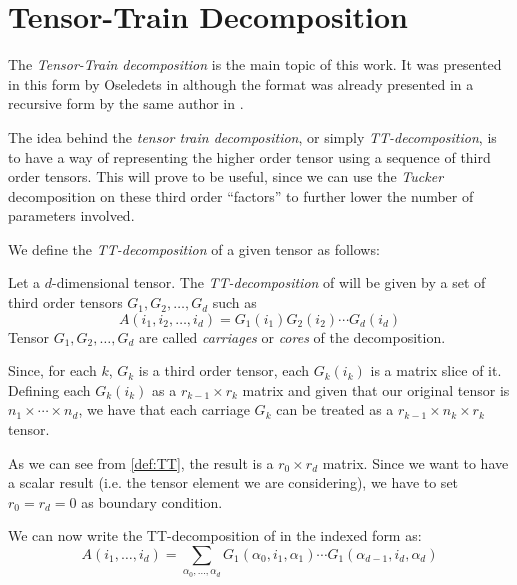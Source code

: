 \chapter{Tensor-Train Decomposition}

The \emph{Tensor-Train decomposition} is the main topic of this work. It was presented in this form by Oseledets in \cite{oseledets2011tt} although the format was already presented in a recursive form by the same author in \cite{oseledetstyrty2009}.

The idea behind the \emph{tensor train decomposition}, or simply \emph{TT-decomposition}, is to have a way of representing the higher order tensor using a sequence of third order tensors. This will prove to be useful, since we can use the \emph{Tucker} decomposition on these third order ``factors'' to further lower the number of parameters involved.

We define the \emph{TT-decomposition} of a given tensor \A as follows:

\begin{Def}
  Let \A a $d$-dimensional tensor. The \emph{TT-decomposition} of \A will be given by a set of third order tensors $G_1,G_2,\dots,G_d$ such as
  \begin{equation} \label{def:TT}
    A(i_1,i_2,\dots,i_d) = G_1(i_1)G_2(i_2)\cdots G_d(i_d)
  \end{equation}
  Tensor $G_1,G_2,\dots,G_d$ are called \emph{carriages} or \emph{cores} of the decomposition.
\end{Def}

Since, for each $k$, $G_k$ is a third order tensor, each $G_k(i_k)$ is a matrix slice of it. Defining each $G_k(i_k)$ as a $r_{k-1} \times r_k$ matrix and given that our original tensor \A is $n_1 \times \cdots \times n_d$, we have that each carriage $G_k$ can be treated as a $r_{k-1} \times n_k \times r_k$ tensor.

As we can see from \ref{def:TT}, the result is a $r_0 \times r_d$ matrix. Since we want to have a scalar result (i.e. the tensor element we are considering), we have to set $r_0 = r_d = 0$ as boundary condition.

We can now write the TT-decomposition of \A in the indexed form as:
\begin{equation} \label{def:TTindex}
  A(i_1,\dots,i_d) = \sum_{\alpha_0,\dots,\alpha_d} G_1(\alpha_0,i_1,\alpha_1) \cdots G_1(\alpha_{d-1},i_d,\alpha_d)
\end{equation}

